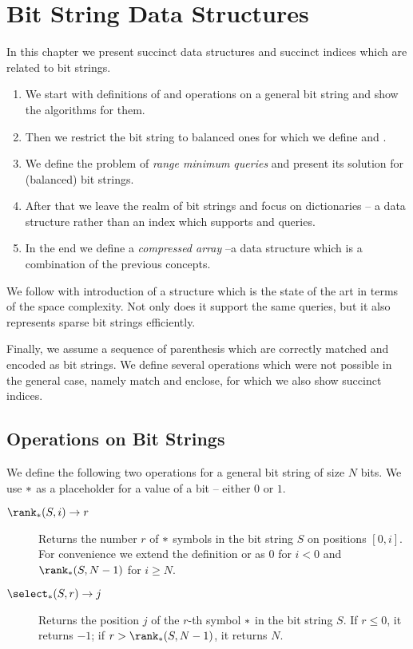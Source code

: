 \chapter{Bit String Data Structures}\label{c:bit-strings}

In this chapter we present succinct data structures and succinct indices which are related to bit strings.
\begin{enumerate}
	\item We start with definitions of \rank{} and \select{} operations on a general bit string and show the algorithms for them.
	\item Then we restrict the bit string to balanced ones for which we define \match{} and \enclose{}.
	\item We define the problem of \emph{range minimum queries} and present its solution for (balanced) bit strings.
	\item After that we leave the realm of bit strings and focus on dictionaries -- a data structure rather than an index which supports \rank{} and \select{} queries.
	\item In the end we define a \emph{compressed array} --a data structure which is a combination of the previous concepts.
\end{enumerate}

We follow with introduction of a structure which is the state of the art in terms of the space complexity.
Not only does it support the same queries, but it also represents sparse bit strings efficiently.

Finally, we assume a sequence of parenthesis which are correctly matched and encoded as bit strings.
We define several operations which were not possible in the general case, namely match and enclose, for which we also show succinct indices.

\section{Operations on Bit Strings}\label{s:op-bs}

We define the following two operations for a general bit string of size $N$ bits.
We use $\ph$ as a placeholder for a value of a bit -- either $0$ or $1$.
\begin{description}
	\item[$\rank_{\ph}(S, i) \rightarrow r$]
	Returns the number $r$ of $\ph$ symbols in the bit string $S$ on positions $[0, i]$.
	For convenience we extend the definition or \rank{} as $0$ for $i < 0$ and $\rank_{\ph}(S, N - 1)$ for $i \ge N$.

	\item[$\select_{\ph}(S, r) \rightarrow j$]
	Returns the position $j$ of the $r$-th symbol $\ph$ in the bit string $S$.
	If $r \le 0$, it returns $-1$; if $r > \rank_{\ph}(S, N - 1)$, it returns $N$.
\end{description}

